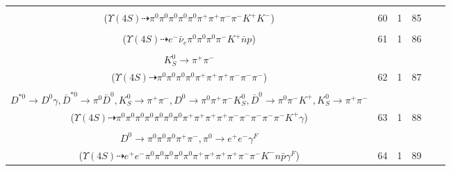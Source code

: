 \documentclass[landscape]{article}
\newcounter{rownumbers}
\newcommand\rn{\stepcounter{rownumbers}\arabic{rownumbers}}
\newcommand{\EOLP}{\\ \hline} %
\newcommand{\topoTags}[1]{#1} %
\begin{document}
\begin{longtable}{clcccc}
\rn & \makecell[l]{ $ 
\Upsilon(4S) \rightarrow B^{0} \bar{B}^{0} ,
B^{0} \rightarrow \pi^{0} \pi^{+} \pi^{-} \pi^{-} \rho^{+} K^{+} K^{-} ,
\bar{B}^{0} \rightarrow \pi^{0} D^{0} ,
\rho^{+} \rightarrow \pi^{0} \pi^{+} ,
D^{0} \rightarrow \pi^{0} \pi^{0} 
$ \\ ($
\Upsilon(4S) \dashrightarrow \pi^{0} \pi^{0} \pi^{0} \pi^{0} \pi^{0} \pi^{+} \pi^{+} \pi^{-} \pi^{-} K^{+} K^{-} 
$) } & \topoTags{60 & }1 & 85 \EOLP

\rn & \makecell[l]{ $ 
\Upsilon(4S) \rightarrow B^{0} \bar{B}^{0} ,
B^{0} \rightarrow D^{-} \bar{n} p ,
\bar{B}^{0} \rightarrow \pi^{0} D^{0} ,
D^{-} \rightarrow e^{-} \bar{\nu}_{e} \pi^{-} K^{+} ,
D^{0} \rightarrow \pi^{0} \pi^{0} 
$ \\ ($
\Upsilon(4S) \dashrightarrow e^{-} \bar{\nu}_{e} \pi^{0} \pi^{0} \pi^{0} \pi^{-} K^{+} \bar{n} p 
$) } & \topoTags{61 & }1 & 86 \EOLP

\rn & \makecell[l]{ $ 
\Upsilon(4S) \rightarrow B^{0} \bar{B}^{0} ,
B^{0} \rightarrow \pi^{0} \bar{D}^{0} ,
\bar{B}^{0} \rightarrow \pi^{-} D^{*+} ,
\bar{D}^{0} \rightarrow \pi^{0} \pi^{0} ,
D^{*+} \rightarrow \pi^{+} D^{0} ,
D^{0} \rightarrow \pi^{0} \pi^{+} \pi^{-} K_{S}^{0} ,
$ \\ $
K_{S}^{0} \rightarrow \pi^{+} \pi^{-} 
$ \\ ($
\Upsilon(4S) \dashrightarrow \pi^{0} \pi^{0} \pi^{0} \pi^{0} \pi^{+} \pi^{+} \pi^{+} \pi^{-} \pi^{-} \pi^{-} 
$) } & \topoTags{62 & }1 & 87 \EOLP

\rn & \makecell[l]{ $ 
\Upsilon(4S) \rightarrow \bar{B}^{0} \bar{B}^{0} ,
\bar{B}^{0} \rightarrow \pi^{0} D^{0} ,
\bar{B}^{0} \rightarrow \eta \bar{K}^{0} D^{*0} \bar{D}^{*0} ,
D^{0} \rightarrow \pi^{0} \pi^{0} ,
\eta \rightarrow \pi^{0} \pi^{+} \pi^{-} ,
\bar{K}^{0} \rightarrow K_{S}^{0} ,
$ \\ $
D^{*0} \rightarrow D^{0} \gamma ,
\bar{D}^{*0} \rightarrow \pi^{0} \bar{D}^{0} ,
K_{S}^{0} \rightarrow \pi^{+} \pi^{-} ,
D^{0} \rightarrow \pi^{0} \pi^{+} \pi^{-} K_{S}^{0} ,
\bar{D}^{0} \rightarrow \pi^{0} \pi^{-} K^{+} ,
K_{S}^{0} \rightarrow \pi^{+} \pi^{-} 
$ \\ ($
\Upsilon(4S) \dashrightarrow \pi^{0} \pi^{0} \pi^{0} \pi^{0} \pi^{0} \pi^{0} \pi^{0} \pi^{+} \pi^{+} \pi^{+} \pi^{+} \pi^{-} \pi^{-} \pi^{-} \pi^{-} \pi^{-} K^{+} \gamma 
$) } & \topoTags{63 & }1 & 88 \EOLP

\rn & \makecell[l]{ $ 
\Upsilon(4S) \rightarrow B^{0} \bar{B}^{0} ,
B^{0} \rightarrow \pi^{0} \bar{D}^{0} ,
\bar{B}^{0} \rightarrow \pi^{+} \pi^{-} K^{-} D^{*+} n \bar{\Delta}^{0} ,
\bar{D}^{0} \rightarrow \pi^{0} \pi^{0} ,
D^{*+} \rightarrow \pi^{+} D^{0} ,
\bar{\Delta}^{0} \rightarrow \pi^{+} \bar{p} ,
$ \\ $
D^{0} \rightarrow \pi^{0} \pi^{0} \pi^{0} \pi^{+} \pi^{-} ,
\pi^{0} \rightarrow e^{+} e^{-} \gamma^{F} 
$ \\ ($
\Upsilon(4S) \dashrightarrow e^{+} e^{-} \pi^{0} \pi^{0} \pi^{0} \pi^{0} \pi^{0} \pi^{+} \pi^{+} \pi^{+} \pi^{+} \pi^{-} \pi^{-} K^{-} n \bar{p} \gamma^{F} 
$) } & \topoTags{64 & }1 & 89 \EOLP


\end{longtable}
\end{document}
